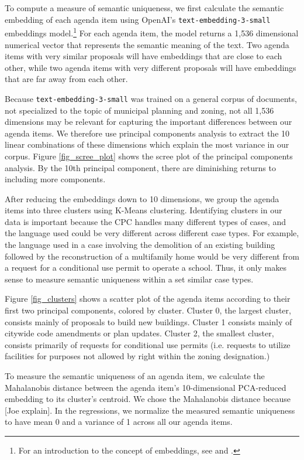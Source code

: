 To compute a measure of semantic uniqueness, we first calculate the semantic embedding of each agenda item using OpenAI's \texttt{text-embedding-3-small} embeddings model.\footnote{For an introduction to the concept of embeddings, see \citet{mikolov2013} and \citet{le2014}.} For each agenda item, the model returns a 1,536 dimensional numerical vector that represents the semantic meaning of the text. Two agenda items with very similar proposals will have embeddings that are close to each other, while two agenda items with very different proposals will have embeddings that are far away from each other. 

Because \texttt{text-embedding-3-small} was trained on a general corpus of documents, not specialized to the topic of municipal planning and zoning, not all 1,536 dimensions may be relevant for capturing the important differences between our agenda items. We therefore use principal components analysis to extract the 10 linear combinations of these dimensions which explain the most variance in our corpus. Figure \ref{fig_scree_plot} shows the scree plot of the principal components analysis. By the 10th principal component, there are diminishing returns to including more components.

After reducing the embeddings down to 10 dimensions, we group the agenda items into three clusters using K-Means clustering. Identifying clusters in our data is important because the CPC handles many different types of cases, and the language used could be very different across different case types. For example, the language used in a case involving the demolition of an existing building followed by the reconstruction of a multifamily home would be very different from a request for a conditional use permit to operate a school. Thus, it only makes sense to measure semantic uniqueness within a set similar case types.

Figure \ref{fig_clusters} shows a scatter plot of the agenda items according to their first two principal components, colored by cluster. Cluster 0, the largest cluster, consists mainly of proposals to build new buildings. Cluster 1 consists mainly of citywide code amendments or plan updates. Cluster 2, the smallest cluster, consists primarily of requests for conditional use permits (i.e. requests to utilize facilities for purposes not allowed by right within the zoning designation.)

To measure the semantic uniqueness of an agenda item, we calculate the Mahalanobis distance between the agenda item's 10-dimensional PCA-reduced embedding to its cluster's centroid. We chose the Mahalanobis distance because [Joe explain]. In the regressions, we normalize the measured semantic uniqueness to have mean 0 and a variance of 1 across all our agenda items.

